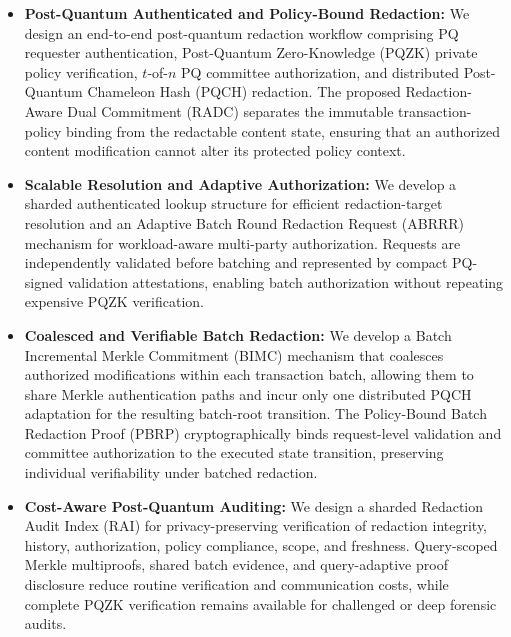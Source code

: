 \documentclass[lettersize,journal]{IEEEtran}
\begin{document}
\begin{itemize}

\item \textbf{Post-Quantum Authenticated and Policy-Bound Redaction:}
We design an end-to-end post-quantum redaction workflow comprising
PQ requester authentication, Post-Quantum Zero-Knowledge (PQZK)
private policy verification, $t$-of-$n$ PQ committee authorization,
and distributed Post-Quantum Chameleon Hash (PQCH) redaction.
The proposed Redaction-Aware Dual Commitment (RADC) separates the
immutable transaction-policy binding from the redactable content
state, ensuring that an authorized content modification cannot alter
its protected policy context.

\item \textbf{Scalable Resolution and Adaptive Authorization:}
We develop a sharded authenticated lookup structure for efficient
redaction-target resolution and an Adaptive Batch Round Redaction
Request (ABRRR) mechanism for workload-aware multi-party
authorization. Requests are independently validated before batching
and represented by compact PQ-signed validation attestations, enabling
batch authorization without repeating expensive PQZK verification.

\item \textbf{Coalesced and Verifiable Batch Redaction:}
We develop a Batch Incremental Merkle Commitment (BIMC) mechanism that
coalesces authorized modifications within each transaction batch,
allowing them to share Merkle authentication paths and incur only one
distributed PQCH adaptation for the resulting batch-root transition.
The Policy-Bound Batch Redaction Proof (PBRP) cryptographically binds
request-level validation and committee authorization to the executed
state transition, preserving individual verifiability under batched
redaction.

\item \textbf{Cost-Aware Post-Quantum Auditing:}
We design a sharded Redaction Audit Index (RAI) for
privacy-preserving verification of redaction integrity, history,
authorization, policy compliance, scope, and freshness. Query-scoped
Merkle multiproofs, shared batch evidence, and query-adaptive proof
disclosure reduce routine verification and communication costs, while
complete PQZK verification remains available for challenged or deep
forensic audits.


\end{itemize}
\end{document}
